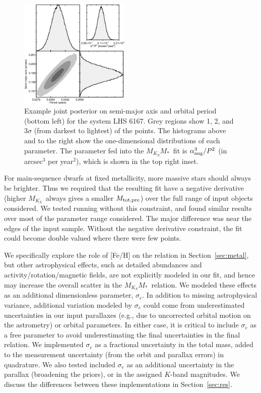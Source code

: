 \documentclass[twocolumn]{aastex62}
\newcommand{\mks}{$M_{K_S}$}
\newcommand{\mmk}{$M_{K_S}$\textendash$M_*$}
\newcommand{\mpred}{$M_{\rm{tot,pre}}$}
\begin{document}
\begin{figure}[htb]
\begin{center}
\includegraphics[width=0.47\textwidth]{LHS6167_corner.eps}
\caption{Example joint posterior on semi-major axis and orbital period (bottom left) for the system LHS 6167. Grey regions show 1, 2, and 3$\sigma$ (from darkest to lightest) of the points. The histograms above and to the right show the one-dimensional distributions of each parameter. The parameter fed into the \mmk\ fit is $\alpha_{\rm{ang}}^3/P^2$ (in arcsec$^3$ per year$^2$), which is shown in the top right inset. }
\label{fig:correlated}
\end{center}
\end{figure}

For main-sequence dwarfs at fixed metallicity, more massive stars should always be brighter. Thus we required that the resulting fit have a negative derivative (higher \mks\ always gives a smaller \mpred) over the full range of input objects considered. We tested running without this constraint, and found similar results over most of the parameter range considered. The major difference was near the edges of the input sample. Without the negative derivative constraint, the fit could become double valued where there were few points.

 We specifically explore the role of [Fe/H] on the relation in Section~\ref{sec:metal}, but other astrophysical effects, such as detailed abundances and activity/rotation/magnetic fields, are not explicitly modeled in our fit, and hence may increase the overall scatter in the \mmk\ relation. We modeled these effects as an additional dimensionless parameter, $\sigma_e$. In addition to missing astrophysical variance, additional variation modeled by $\sigma_e$ could come from underestimated uncertainties in our input parallaxes (e.g., due to uncorrected orbital motion on the astrometry) or orbital parameters. In either case, it is critical to include $\sigma_e$ as a free parameter to avoid underestimating the final uncertainties in the final relation. We implemented $\sigma_e$ as a fractional uncertainty in the total mass, added to the measurement uncertainty (from the orbit and parallax errors) in quadrature. We also tested included $\sigma_e$ as an additional uncertainty in the parallax (broadening the priors), or in the assigned $K$-band magnitudes. We discuss the differences between these implementations in Section~\ref{sec:res}.
\end{document}
